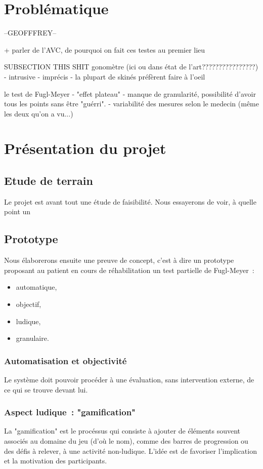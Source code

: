 \documentclass{report}
\begin{document}
		\section{Problématique} --GEOFFFREY--
		
		
		+ parler de l'AVC, de pourquoi on fait ces testes au premier lieu
		
		
		
		
		SUBSECTION THIS SHIT
		gonomètre (ici ou dans état de l'art????????????????)
		- intrusive
		- imprécis
		- la plupart de skinés préfèrent faire à l'oeil
		
		le test de Fugl-Meyer
		- "effet plateau" - manque de granularité, possibilité d'avoir tous les points sans être "guérri".
		- variabilité des mesures selon le medecin (même les deux qu'on a vu...)
		
	\newpage
		\section{Présentation du projet}
		
		\subsection{Etude de terrain}
		Le projet est avant tout une étude de faisibilité. Nous essayerons de voir,
		à quelle point un 
		
		\subsection{Prototype}
		Nous élaborerons ensuite une preuve de concept, c'est à dire un 
		prototype proposant au patient en cours de réhabilitation un test partielle 
		de Fugl-Meyer~:
		\begin{itemize}
		\item automatique,
		\item objectif, 
		\item ludique,
		\item granulaire.
		\end{itemize}
		
		\subsubsection{Automatisation et objectivité}
		Le système doit pouvoir procéder à une évaluation, sans intervention 
		externe, de ce qui se trouve devant lui. 
	
		\subsubsection{Aspect ludique~: "gamification"}
		La "gamification" est le procéssus qui consiste à ajouter de éléments 
		souvent associés au domaine du jeu (d'où le nom), comme des barres de
		progression ou des défis à relever, à une activité non-ludique. L'idée est 
		de favoriser l'implication et la motivation des participants. 
		
\end{document}
